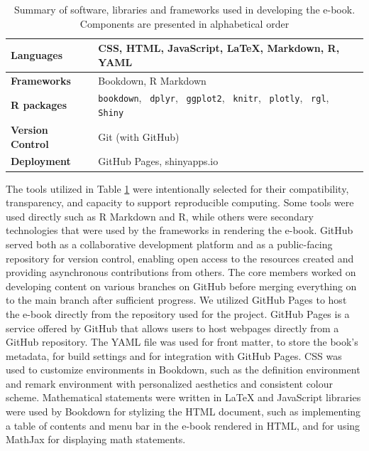 \documentclass[11pt]{article}
\begin{document}
\renewcommand\arraystretch{1.20}
\begin{table}[H]
\setlength{\belowcaptionskip}{-25pt}
\begin{center}
\begin{tabular}{| l | l |}
\hline
\textbf{Languages}		&	CSS, HTML, JavaScript, LaTeX, Markdown, R, YAML\\
\hline
\textbf{Frameworks} 		&	Bookdown, R Markdown\\
\hline
\textbf{R packages}		&	\texttt{bookdown}, \, \texttt{dplyr}, \, \texttt{ggplot2}, \, \texttt{knitr}, \, \texttt{plotly}, \, \texttt{rgl}, \,\texttt{Shiny}\\
\hline
\textbf{Version Control} 	&	Git (with GitHub)\\
\hline
\textbf{Deployment} 		&	GitHub Pages, shinyapps.io\\
\hline
\end{tabular}
\caption{Summary of software, libraries and frameworks used in developing the e-book. Components are presented in alphabetical order}
\label{tab:ebook_Technologies}
\end{center}
\end{table}
\renewcommand\arraystretch{1.00}

The tools utilized in Table \ref{tab:ebook_Technologies} were intentionally selected for their compatibility, transparency, and capacity to support reproducible computing. 
Some tools were used directly such as R Markdown and R, while others were secondary technologies that were used by the frameworks in rendering the e-book.
GitHub served both as a collaborative development platform and as a public-facing repository for version control, enabling open access to the resources created and providing asynchronous contributions from others.
The core members worked on developing content on various branches on GitHub before merging everything on to the main branch after sufficient progress.
We utilized GitHub Pages to host the e-book directly from the repository used for the project.
GitHub Pages is a service offered by GitHub that allows users to host webpages directly from a GitHub repository.
The YAML file was used for front matter, to store the book’s metadata, for build settings and for integration with GitHub Pages.
CSS was used to customize environments in Bookdown, such as the definition environment and remark environment with personalized aesthetics and consistent colour scheme.
Mathematical statements were written in LaTeX and JavaScript libraries were used by Bookdown for stylizing the HTML document, such as implementing a table of contents and menu bar in the e-book rendered in HTML, and for using MathJax for displaying math statements.
\end{document}
